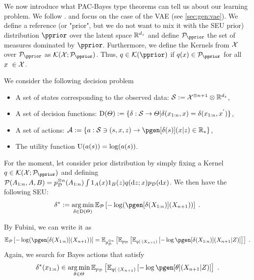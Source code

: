 We now introduce what PAC-Bayes type theorems can tell us about our learning problem. We follow \cite{mbacke2023statistical}.
and focus on the case of the VAE (see \cref{sec:gen:vae}).
We define a reference (or "prior", but we do not want to mix it with the SEU prior) distribution $\pprior$ over the latent space $\mathbb{R}^{{d_z}}$ and define $\pset{\pprior}$ the set of measures dominated by $\pprior$.
Furthermore, we define the Kernels from $\mathcal{X}$ over $\pset{\pprior}$ as $\mathcal{K}(\xsp; \pset{\pprior})$. Thus, $q \in \mathcal{K}(\pprior)$ if $q(\lstate) \in \pset{\pprior}$ for all $\lstate \in \xsp$.

We consider the following decision problem
\begin{itemize}
    \item A set of states corresponding to the observed data: $\mathcal{S} := {\mathcal{X}}^{\otimes n + 1} \otimes \mathbb{R}^{{d_z}}$,
    \item A set of decision functions: $\mathrm{D}(\varTheta) := \{\delta: \mathcal{S} \rightarrow \varTheta | \delta({x}_{1:n},x) = \delta({x}_{1:n},{x}^{'})\}$,
    \item A set of actions: $\actionset \eqdef \{a: \stateset \ni (s, \lstate, z) \rightarrow \pgen[\decfun(s)](\lstate | z) \in \rsetpos \}$,
    \item The utility function $\mathrm{U}(a(s)) = \log(a(s))$.
\end{itemize}
For the moment, let consider prior distribution by simply fixing a Kernel $q \in \mathcal{K}(\xsp; \pset{\pprior})$ and defining $\mathcal{P}(A_{1:n}, A, B) = p_{\mathcal{D}}^{\otimes n}(A_{1:n}) \int \mathrm{1}_{A}(x) \mathrm{1}_{B}(z)q(\mathrm{d} z; x)p_{\mathcal{D}}(\mathrm{d} x)$. 
We then have the following SEU:
\begin{equation}
    \label{eq:pbayes_seu}
    \tmin{\decfun} \eqdef \argmin_{\decfun \in \decfunset{\paramset}} \PE{\mathcal{P}}{-\log(\pgen[\decfun(\chunk{\state}{1}{\ndata})](\state_{\ndata+1}))} \eqsp.
\end{equation}

By Fubini, we can write it as 
\begin{equation}
    \label{eq:pbayes_seu:v2}
    \PE{\mathcal{P}}{-\log(\pgen[\decfun(\chunk{\state}{1}{\ndata})](\state_{\ndata+1}))} = \PE{\pdata^{\tensprod n}}{\PE{\pdata}{\PE{q(\cdot | \state_{n+1})}{ - \log \pgen[\decfun(\chunk{\state}{1}{n})](\state_{n+1} | Z)}}}\eqsp.
\end{equation}
Again, we search for Bayes actions that satisfy
\begin{equation*}
    \tmin{\decfun}(\lstate_{1:n}) \in \argmin_{\param \in \paramset} \PE{\pdata}{\PE{q(\cdot | \state_{n+1})}{ - \log \pgen[\param](\state_{n+1} | Z)}} \eqsp.
\end{equation*}

